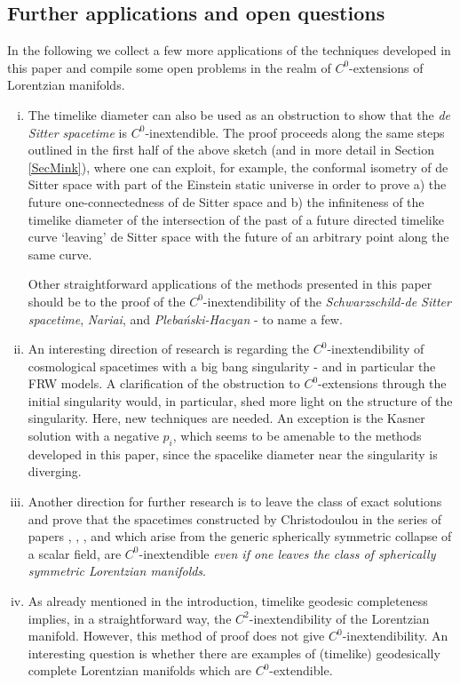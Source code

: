 \documentclass[reqno]{article}
\begin{document}
\subsection{Further applications and open questions}

In the following we collect a few more applications of the techniques developed in this paper and compile some open problems in the realm of $C^0$-extensions of Lorentzian manifolds.

\begin{enumerate}[i)]
\item The timelike diameter can also be used as an obstruction to show that the \emph{de Sitter spacetime} is $C^0$-inextendible. The proof proceeds along the same steps outlined in the first half of the above sketch (and in more detail in Section \ref{SecMink}), where one can exploit, for example, the conformal isometry of de Sitter space with part of the Einstein static universe in order to prove a) the future one-connectedness of de Sitter space and b) the infiniteness of the timelike diameter of the intersection of the past of a future directed timelike curve `leaving' de Sitter space with the future of an arbitrary point along the same curve.

Other straightforward applications of the methods presented in this paper should be to the proof of the $C^0$-inextendibility of the \emph{Schwarzschild-de Sitter spacetime}, \emph{Nariai}, and \emph{Pleba\'{n}ski-Hacyan} - to name a few. 

\item An interesting direction of research is regarding the $C^0$-inextendibility of cosmological spacetimes with a big bang singularity - and in particular the FRW models. A clarification of the obstruction to $C^0$-extensions through the initial singularity would, in particular, shed more light on the structure of the singularity. Here, new techniques are needed. An exception is the Kasner solution with a negative $p_i$, which seems to be amenable to the methods developed in this paper, since the spacelike diameter near the singularity is diverging.

\item Another direction for further research is to leave the class of exact solutions and prove that the spacetimes constructed by Christodoulou in the series of papers \cite{Chris91}, \cite{Chris93}, \cite{Chris99}, and which arise from the generic spherically symmetric collapse of a scalar field, are $C^0$-inextendible \emph{even if one leaves the class of spherically symmetric Lorentzian manifolds}.

\item As already mentioned in the introduction, timelike geodesic completeness implies, in a straightforward way, the $C^2$-inextendibility of the Lorentzian manifold. However, this method of proof does not give $C^0$-inextendibility. An interesting question is whether there are examples of (timelike) geodesically complete Lorentzian manifolds which are $C^0$-extendible. 

\end{enumerate}
\end{document}
